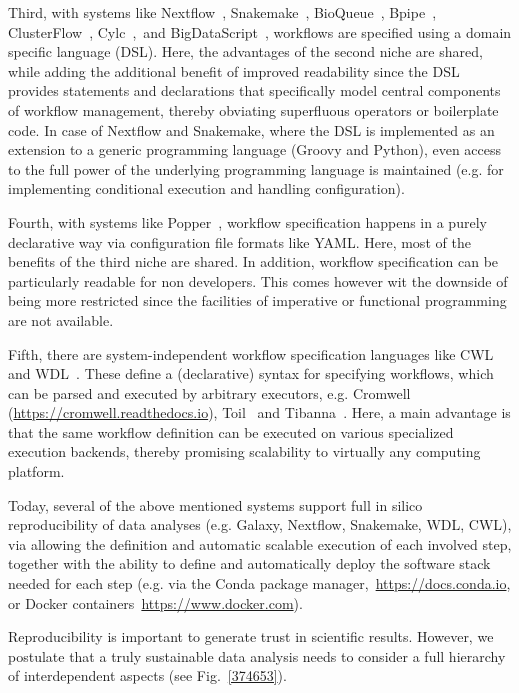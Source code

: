 \documentclass{scrartcl}
\begin{document}
Third, with systems like Nextflow~\parencite{Di_Tommaso_2017},
Snakemake~\parencite{Köster2012}, BioQueue~\parencite{Yao2017},
Bpipe~\parencite{Sadedin2012}, ClusterFlow~\parencite{Ewels2016},
Cylc~\parencite{J_Oliver_2018},~and BigDataScript~\parencite{Cingolani_2014},
workflows are specified using a domain specific language (DSL). Here,
the advantages of the second niche are shared, while adding the
additional benefit of improved readability since the DSL provides
statements and declarations that specifically model central components
of workflow management, thereby obviating superfluous operators or
boilerplate code. In case of Nextflow and Snakemake, where the DSL is
implemented as an extension to a generic programming language (Groovy
and Python), even access to the full power of the underlying programming
language is maintained (e.g. for implementing conditional execution and
handling configuration).

Fourth, with systems like Popper~\parencite{Jimenez_2017}, workflow
specification happens in a purely declarative way via configuration file
formats like YAML. Here, most of the benefits of the third niche are
shared. In addition, workflow specification can be particularly readable
for non developers. This comes however wit the downside of being more
restricted since the facilities of imperative or functional programming
are not available.

Fifth, there are system-independent workflow specification languages
like CWL~\parencite{cwl} and WDL~\parencite{voss_full-stack_2017}. These define a
(declarative) syntax for specifying workflows, which can be parsed and
executed by arbitrary executors, e.g. Cromwell
(\url{https://cromwell.readthedocs.io}), Toil~\parencite{Vivian_2017} and
Tibanna~\parencite{Lee_2019}. Here, a main advantage is that the same
workflow definition can be executed on various specialized execution
backends, thereby promising scalability to virtually any computing
platform.

Today, several of the above mentioned systems support full in silico
reproducibility of data analyses (e.g. Galaxy, Nextflow, Snakemake, WDL,
CWL), via allowing the definition and automatic scalable execution of
each involved step, together with the ability to define and
automatically deploy the software stack needed for each step (e.g. via
the Conda package manager,~\url{https://docs.conda.io}, or Docker
containers~\url{https://www.docker.com}).

Reproducibility is important to generate trust in scientific results.
However, we postulate that a truly sustainable data analysis needs to
consider a full hierarchy of interdependent aspects (see
Fig.~{\ref{374653}}).

\printbibliography
\end{document}

